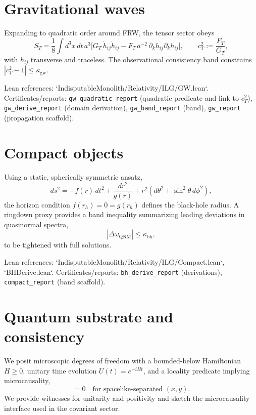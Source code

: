 \documentclass[11pt]{article}
\newcommand{\ctwo}{c_T^2}
\begin{document}
\section{Gravitational waves}
Expanding to quadratic order around FRW, the tensor sector obeys
\begin{equation}
  S_T = \frac{1}{8}\int d^3x\,dt\, a^3 \big[ G_T\, \dot h_{ij}\dot h_{ij} - F_T\, a^{-2}\, \partial_k h_{ij}\partial_k h_{ij} \big],\qquad \ctwo := \frac{F_T}{G_T},
\end{equation}
with $h_{ij}$ transverse and traceless. The observational consistency band constrains $|\ctwo-1|\le \kappa_{\mathrm{gw}}$.

Lean references: `IndisputableMonolith/Relativity/ILG/GW.lean`. Certificates/reports: \texttt{gw\_quadratic\_report} (quadratic predicate and link to $\ctwo$), \texttt{gw\_derive\_report} (domain derivation), \texttt{gw\_band\_report} (band), \texttt{gw\_report} (propagation scaffold).

\section{Compact objects}
Using a static, spherically symmetric ansatz,
\begin{equation}
  ds^2 = -f(r)\,dt^2 + \frac{dr^2}{g(r)} + r^2(d\theta^2+\sin^2\!\theta\, d\phi^2),
\end{equation}
the horizon condition $f(r_h)=0=g(r_h)$ defines the black-hole radius. A ringdown proxy provides a band inequality summarizing leading deviations in quasinormal spectra,
\begin{equation}
  |\Delta \omega_{\mathrm{QNM}}| \le \kappa_{\mathrm{bh}},
\end{equation}
to be tightened with full solutions.

Lean references: `IndisputableMonolith/Relativity/ILG/Compact.lean`, `BHDerive.lean`. Certificates/reports: \texttt{bh\_derive\_report} (derivations), \texttt{compact\_report} (band scaffold).

\section{Quantum substrate and consistency}
We posit microscopic degrees of freedom with a bounded-below Hamiltonian $H\ge 0$, unitary time evolution $U(t)=e^{-iHt}$, and a locality predicate implying microcausality,
\begin{equation}
  [\mathcal{O}(x),\mathcal{O}(y)] = 0 \quad \text{for spacelike-separated } (x,y).
\end{equation}
We provide witnesses for unitarity and positivity and sketch the microcausality interface used in the covariant sector.
\end{document}

